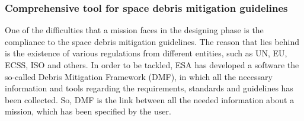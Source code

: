 
\bigskip
\subsubsection{Comprehensive tool for space debris mitigation guidelines}
\bigskip
One of the difficulties that a mission faces in the designing phase is the compliance to the space debris mitigation guidelines. The reason that lies behind is the existence of various regulations from different entities, such as UN, EU, ECSS, ISO and others. In order to be tackled, ESA has developed a software the so-called Debris Mitigation Framework (DMF), in which all the necessary information and tools regarding the requirements, standards and guidelines has been collected. So, DMF is the link between all the needed information about a mission, which has been specified by the user. \cite{Braun}

\bigskip
